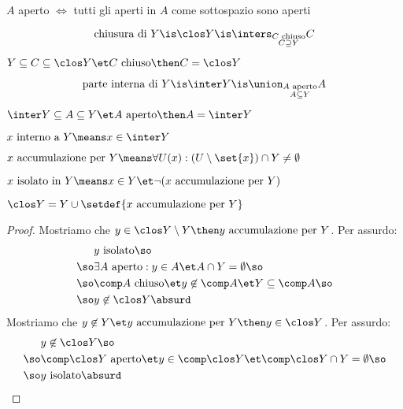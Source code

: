 
\begin{prop}
$A$ aperto $\iff$ tutti gli aperti in $A$ come sottospazio sono aperti
\end{prop}


\begin{defn}
\[\text{chiusura di }Y\is\clos Y\is\inters_{\substack{C\text{ chiuso}\\C\supseteq Y}}C\]
\end{defn}

\begin{prop}
$Y\subseteq C\subseteq\clos Y\et C\text{ chiuso}\then C=\clos Y$
\end{prop}

\begin{defn}
\[\text{parte interna di }Y\is\inter Y\is\union_{\substack{A\text{ aperto}\\A\subseteq Y}}A\]
\end{defn}

\begin{prop}
$\inter Y\subseteq A\subseteq Y\et A\text{ aperto}\then A=\inter Y$
\end{prop}

\begin{defn}
$x\text{ interno a }Y\means x\in\inter Y$
\end{defn}

\begin{defn}
$x\text{ accumulazione per }Y\means\forall U(x):(U\setminus\set{x})\cap Y\neq\emptyset$
\end{defn}

\begin{defn}
$x\text{ isolato in }Y\means x\in Y\et\neg(x\text{ accumulazione per }Y)$
\end{defn}

\begin{lemma}
$\clos Y=Y\cup\setdef{x\text{ accumulazione per }Y}$
\end{lemma}
\begin{proof}
Mostriamo che $y\in\clos Y\setminus Y\then y\text{ accumulazione per }Y$. Per assurdo:
\begin{align*}
&y\text{ isolato}\so\\
\so&\exists A\text{ aperto}:y\in A\et A\cap Y=\emptyset\so\\
\so&\comp A\text{ chiuso}\et y\not\in\comp A\et Y\subseteq\comp A\so\\
\so&y\not\in\clos Y\absurd
\end{align*}
Mostriamo che $y\not\in Y\et y\text{ accumulazione per }Y\then y\in\clos Y$. Per assurdo:
\begin{align*}
&y\not\in\clos Y\so\\
\so&\comp\clos Y\text{ aperto}\et y\in\comp\clos Y\et\comp\clos Y\cap Y=\emptyset\so\\
\so&y\text{ isolato}\absurd \qedhere
\end{align*}
\end{proof}

